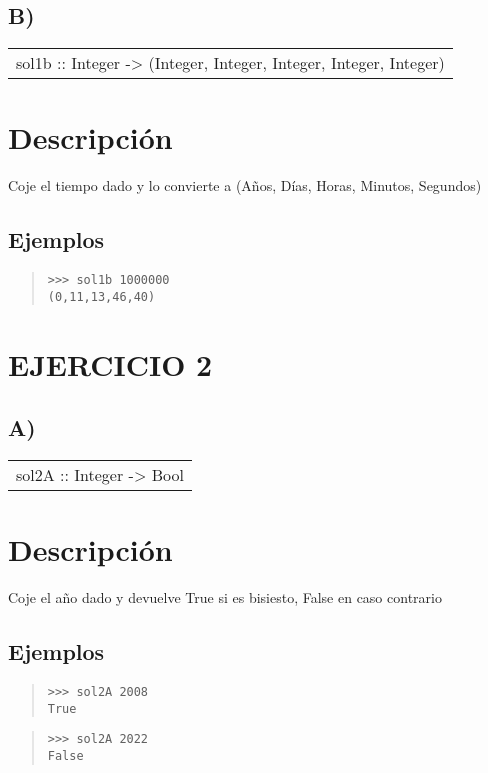 \subsection{B)}
\begin{haddockdesc}
\item[\begin{tabular}{@{}l}
sol1b :: Integer -> (Integer, Integer, Integer, Integer, Integer)
\end{tabular}]
{\haddockbegindoc
\section*{Descripción}
Coje el tiempo dado y lo convierte a (Años, Días, Horas, Minutos, Segundos)\par
\subsection*{Ejemplos}
\begin{quote}
{\haddockverb\begin{verbatim}
>>> sol1b 1000000
(0,11,13,46,40)

\end{verbatim}}
\end{quote}}
\end{haddockdesc}
\section{EJERCICIO 2}
\subsection{A)}
\begin{haddockdesc}
\item[\begin{tabular}{@{}l}
sol2A :: Integer -> Bool
\end{tabular}]
{\haddockbegindoc
\section*{Descripción}
Coje el año dado y devuelve True si es bisiesto, False en caso contrario\par
\subsection*{Ejemplos}
\begin{quote}
{\haddockverb\begin{verbatim}
>>> sol2A 2008
True

\end{verbatim}}
\end{quote}
\begin{quote}
{\haddockverb\begin{verbatim}
>>> sol2A 2022
False

\end{verbatim}}
\end{quote}}
\end{haddockdesc}
